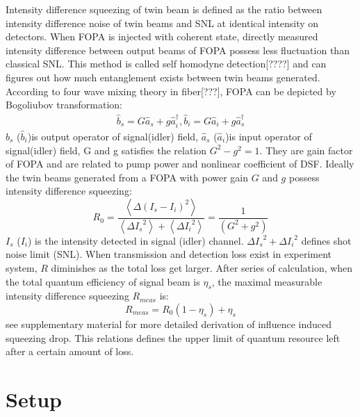 \documentclass[9pt,twocolumn,twoside]{osajnl}
\begin{document}
Intensity difference squeezing of twin beam is defined as the ratio between intensity difference noise of twin beams and SNL at identical intensity on detectors. When FOPA is injected with coherent state, directly measured intensity difference between output beams of FOPA possess less fluctuation than classical SNL. This method is called self homodyne detection[????] and can figures out how much entanglement exists between twin beams generated.
According to four wave mixing theory in fiber\cite{guo13}[???], FOPA can be depicted by Bogoliubov transformation:
\begin{equation}
\begin{array}{c}
\hat b_s = G{\hat a_s} + g\hat a_i^\dag ,   
\hat b_i = G{\hat a_i} + g\hat a_s^\dag 
\end{array}
\end{equation}
$\hat b_s$ ($\hat b_i$)is output operator of signal(idler) field, $\hat a_s$ ($\hat a_i$)is input operator of signal(idler) field, G and g satisfies the relation $G^2-g^2=1$. They are gain factor of FOPA and are related to pump power and nonlinear coefficient of DSF.
Ideally the twin beams generated from a FOPA with power gain $G$ and $g$ possess intensity difference squeezing:
\begin{equation}
{R_0} = \frac{
{\left\langle {\Delta {{({I_s} - {I_i})}^2}} \right\rangle }}
{{\left\langle {\Delta {I_s}^2} \right\rangle  + \left\langle {\Delta {I_i}^2} \right\rangle }} = \frac{1}{{({G^2} + {g^2})}}
\label{eq:R0}
\end{equation}
$I_s$ ($I_i$) is the intensity detected in signal (idler) channel. $\Delta{I_s}^2+\Delta{I_i}^2$ defines shot noise limit (SNL). When transmission and detection loss exist in experiment system, $R$ diminishes as the total loss get larger.
After series of calculation, when the total quantum efficiency of signal beam is $\eta_s$, the maximal measurable intensity difference squeezing $R_{meas}$ is:
\begin{equation}
R_{meas}=R_0(1-\eta_s)+\eta_s
\label{eq:loss}
\end{equation}see supplementary material for more detailed derivation of influence induced squeezing drop.
This relations defines the upper limit of quantum resource left after a certain amount of loss.



\section{Setup}
\end{document}
